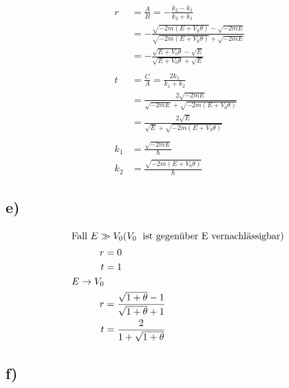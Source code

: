     \begin{align*}
        r  &= \frac{A}{B} = -\frac{k_2-k_1}{k_2+k_1}\\
        &= -\frac{\sqrt{-2m(E+V_0\theta)} - \sqrt{-2mE}}{\sqrt{-2m(E+V_0\theta)} + \sqrt{-2mE}}\\
        &= -\frac{\sqrt{E+V_0\theta} - \sqrt{E}}{\sqrt{E+V_0\theta} + \sqrt{E}}\\
        \\
        t &= \frac{C}{A} = \frac{2k_1}{k_1 + k_2}\\
        &= \frac{2\sqrt{-2mE}}{\sqrt{-2mE} + \sqrt{-2m(E+V_0\theta)}}\\
        &= \frac{2\sqrt{E}}{\sqrt{E} + \sqrt{-2m(E+V_0\theta)}}\\
        \\
        k_1 &= \frac{\sqrt{-2mE}}{\hbar}\\
        k_2 &= \frac{\sqrt{-2m(E+V_0\theta)}}{\hbar}
    \end{align*}

\subsection{e)}

    \begin{align*}
        \intertext{Fall $E \gg V_0  (V_0\;$ ist gegen\"uber E vernachl\"assigbar)
        }
        r &= 0\\
        t &= 1\\
        E \rightarrow V_0\\
        r &= \frac{\sqrt{1+\theta}-1}{\sqrt{1+\theta}+1}\\
        t &= \frac{2}{1+\sqrt{1+\theta}}
    \end{align*}

\subsection{f)}

